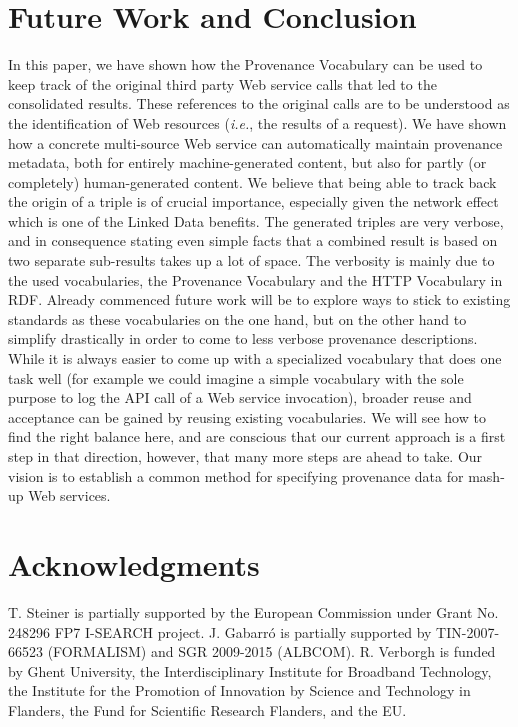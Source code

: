 \documentclass[twocolumn]{article}
\begin{document}
{\section{Future Work and Conclusion}                                                        
\label{sec:conclusion}
In this paper, we have shown how the Provenance
Vocabulary can be used to keep track of the original third party Web service calls that led to the consolidated
results. These references to the original calls are to be understood as the identification of Web resources (\emph{i.e.}, the
results of a request). We have shown how a concrete multi-source Web service can automatically maintain provenance
metadata, both for entirely machine-generated content, but also for partly (or completely) human-generated content. We
believe that being able to track back the origin of a triple is of crucial importance, especially given the network
effect which is one of the Linked Data benefits. The generated triples are very verbose, and in consequence stating even simple facts that a combined result is based on two separate sub-results takes up a lot of space. The verbosity is mainly due to the used vocabularies, the Provenance Vocabulary and the HTTP Vocabulary in RDF.
Already commenced future work will be to explore ways to stick to existing standards as these vocabularies on the one hand, but on the other hand to simplify drastically in order to come to less verbose provenance descriptions. While it is always easier to come up with a specialized vocabulary that does one task well (for example we could imagine a simple vocabulary with the sole purpose to log the API call of a Web service invocation), broader reuse and acceptance can be gained by reusing existing vocabularies. We will see how to find the right balance here, and are conscious that our current approach is a first step in that direction, however, that many more steps are ahead to take. Our vision is to establish a common method for specifying provenance data for mash-up Web services. 

\section*{Acknowledgments}
T. Steiner is partially supported by the European Commission under Grant No. 248296 FP7 I-SEARCH project. J. Gabarr\'o is partially supported by TIN-2007-66523 (FORMALISM) and SGR 2009-2015 (ALBCOM). 
R. Verborgh is funded by Ghent University, the Interdisciplinary Institute for Broadband Technology, the Institute for the Promotion of Innovation by Science and Technology in Flanders, the Fund for Scientific Research Flanders, and the EU.
\newpage



}
\end{document}
